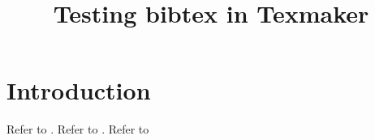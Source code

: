 \documentclass{article}
\begin{document}
\title{Testing bibtex in Texmaker}
\maketitle

\section{Introduction}

Refer to  \cite{plazas2012}.
Refer to \cite{abramowitz+stegun}.
Refer to \cite{voigt2012}



%
\end{document}
